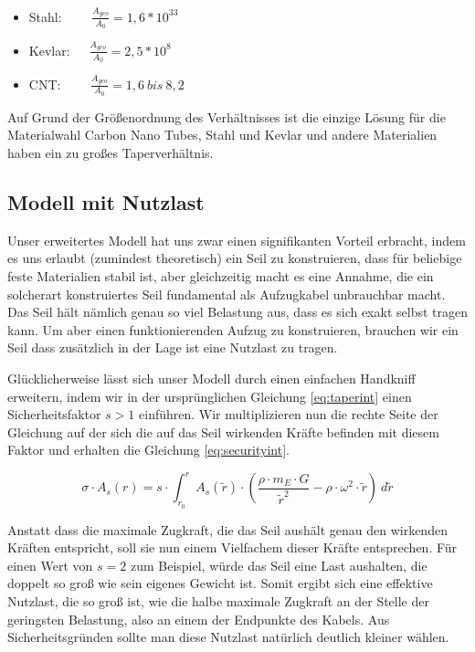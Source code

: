 \documentclass[a4paper, 10pt]{report}
\begin{document}
\begin{itemize}
\item Stahl: \ \ \ \ $\frac{A_{geo}}{A_0} = 1,6 *10^{33}$
\item Kevlar:\ \ \   $\frac{A_{geo}}{A_0} = 2,5 *10^8$
\item CNT: \ \ \ \ $\frac{A_{geo}}{A_0} = 1,6\ bis\ 8,2 $ 
\end{itemize}

Auf Grund der Größenordnung des Verhältnisses ist die einzige Lösung für die Materialwahl Carbon Nano Tubes, Stahl und Kevlar und andere Materialien haben ein zu großes Taperverhältnis.

\subsection{Modell mit Nutzlast}

Unser erweitertes Modell hat uns zwar einen signifikanten Vorteil erbracht, indem es uns erlaubt (zumindest theoretisch) ein Seil zu konstruieren, dass für beliebige feste Materialien stabil ist, aber gleichzeitig macht es eine Annahme, die ein solcherart konstruiertes Seil fundamental als Aufzugkabel unbrauchbar macht. Das Seil hält nämlich genau so viel Belastung aus, dass es sich exakt selbst tragen kann. Um aber einen funktionierenden Aufzug zu konstruieren, brauchen wir ein Seil dass zusätzlich in der Lage ist eine Nutzlast zu tragen.

Glücklicherweise lässt sich unser Modell durch einen einfachen Handkniff erweitern, indem wir in der ursprünglichen Gleichung \ref{eq:taperint} einen Sicherheitsfaktor $s>1$ einführen. Wir multiplizieren nun die rechte Seite der Gleichung auf der sich die auf das Seil wirkenden Kräfte befinden mit diesem Faktor und erhalten die Gleichung \ref{eq:securityint}.

\begin{equation}
\sigma \cdot A_s(r) = s \cdot \int_{r_0}^{r} A_s(\tilde{r}) \cdot (\frac{\rho\cdot m_E \cdot G}{\tilde{r}^2} - \rho \cdot \omega^2 \cdot \tilde{r})\ d\tilde{r}
\label{eq:securityint}
\end{equation}

Anstatt dass die maximale Zugkraft, die das Seil aushält genau den wirkenden Kräften entspricht, soll sie nun einem Vielfachem dieser Kräfte entsprechen. Für einen Wert von $s=2$ zum Beispiel, würde das Seil eine Last aushalten, die doppelt so groß wie sein eigenes Gewicht ist. Somit ergibt sich eine effektive Nutzlast, die so groß ist, wie die halbe maximale Zugkraft an der Stelle der geringsten Belastung, also an einem der Endpunkte des Kabels. Aus Sicherheitsgründen sollte man diese Nutzlast natürlich deutlich kleiner wählen.
\end{document}
